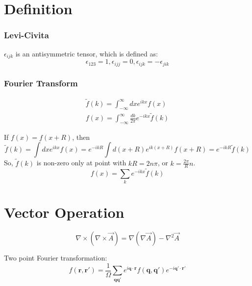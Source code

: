\section{Definition}

\subsubsection{Levi-Civita}
$\epsilon_{ijk}$ is an antisymmetric tensor, which is defined as: 
\begin{equation}
    \label{eqn:math::Levi-Civita}
    \epsilon_{123} = 1, \epsilon_{ijj} = 0, \epsilon_{ijk} = -\epsilon_{jik}
\end{equation}

\subsubsection{Fourier Transform}
\begin{equation}
    \label{eqn:math::FT}
    \begin{gathered}
    \displaystyle \tilde{f}(k) = \int_{-\infty}^{\infty}dx e^{ikx}f(x)	\\
    \displaystyle f(x) = \int_{-\infty}^{\infty}\frac{dk}{2\pi}e^{-ikx}\tilde{f}(k)
    \end{gathered}
\end{equation}

If $f(x) = f(x+R)$, then 
\begin{equation}
    \tilde{f}(k) = \int dx e^{ikx}f(x) = e^{-ikR} \int d(x+R) e^{ik(x+R)}f(x+R) = e^{-ikR} \tilde{f}(k)
\end{equation}
So, $\tilde{f}(k)$ is non-zero only at point with $kR = 2n\pi$, or $k = \frac{2\pi}{R}n$.
\begin{equation}
    \displaystyle f(x) = \sum_{k} e^{-ikx}\tilde{f}(k)
\end{equation}

\section{Vector Operation}
\begin{equation}
    \nabla\times(\nabla\times\vec{A}) = \nabla(\nabla\vec{A}) - \nabla^2\vec{A} 
\end{equation}

Two point Fourier transformation:
\begin{equation}
    \displaystyle f(\bm{r,r'}) = \frac{1}{\Omega}\sum_{\bm{qq'}}e^{i\bm{q\cdot r}}f(\bm{q,q'})e^{-i\bm{q'\cdot r'}}
\end{equation}

